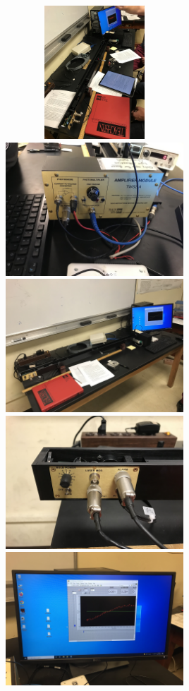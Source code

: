 \documentclass[fleqn]{article}
\begin{document}
  \begin{figure}[h!]
    \includegraphics[height=5cm, width=9cm]{2 (1).jpg}
    \includegraphics[height=5cm, width=9cm]{2 (2).jpg}
    \includegraphics[height=5cm, width=9cm]{2 (3).jpg}
    \includegraphics[height=5cm, width=9cm]{2 (4).jpg}
    \includegraphics[height=5cm, width=9cm]{2 (5).jpg}

\end{figure}
\end{document}
